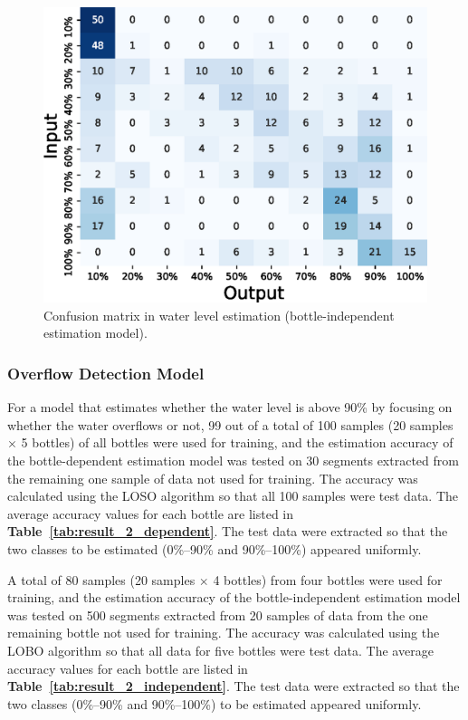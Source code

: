 \documentclass[sigconf]{acmart}
\newcommand\tabref[1]{\textbf{Table~\ref{tab:#1}}}
\begin{document}
\begin{figure}[!t]
\begin{minipage}[t]{0.32\linewidth}
    \includegraphics[width=0.9\linewidth]{figures/confusion_matrix_10_independent_tokkuri.eps}
  \end{minipage}
  \caption{Confusion matrix in water level estimation (bottle-independent estimation model).}
  \label{fig:confusion_matrix_10_independent}
\end{figure}

\subsubsection{Overflow Detection Model}
For a model that estimates whether the water level is above 90\% by focusing on whether the water overflows or not, 99 out of a total of 100 samples (20 samples $\times$ 5 bottles) of all bottles were used for training, and the estimation accuracy of the bottle-dependent estimation model was tested on 30 segments extracted from the remaining one sample of data not used for training. The accuracy was calculated using the LOSO algorithm so that all 100 samples were test data. The average accuracy values for each bottle are listed in \tabref{result_2_dependent}. The test data were extracted so that the two classes to be estimated (0\%--90\% and 90\%--100\%) appeared uniformly.\par

A total of 80 samples (20 samples $\times$ 4 bottles) from four bottles were used for training, and the estimation accuracy of the bottle-independent estimation model was tested on 500 segments extracted from 20 samples of data from the one remaining bottle not used for training. The accuracy was calculated using the LOBO algorithm so that all data for five bottles were test data. The average accuracy values for each bottle are listed in \tabref{result_2_independent}. The test data were extracted so that the two classes (0\%--90\% and 90\%--100\%) to be estimated appeared uniformly.\par
\end{document}
